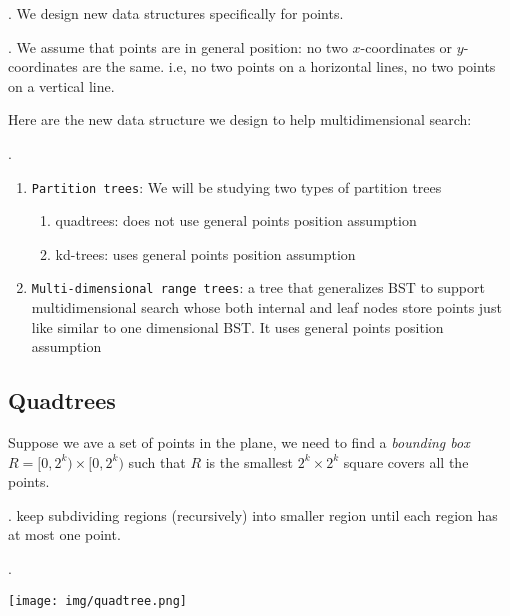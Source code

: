 \documentclass{article}
\begin{document}
\begin{discovery}[].
    We design new data structures specifically for points. 
\end{discovery}

\begin{comm}[].
    We assume that points are in general position: no two $x$-coordinates or $y$-coordinates are the same. i.e, no two points on a horizontal lines, no two points on a vertical line. 
\end{comm}

Here are the new data structure we design to help multidimensional search: 

\begin{result}[].
    \begin{enumerate}
        \item \texttt{Partition trees}: We will be studying two types of partition trees \begin{enumerate}
            \item quadtrees: does not use general points position assumption \item kd-trees: uses general points position assumption 
        \end{enumerate}
        
        \item \texttt{Multi-dimensional range trees}: a tree that generalizes BST to support multidimensional search whose both internal and leaf nodes store points just like similar to one dimensional BST. It uses general points position assumption
    \end{enumerate} 
\end{result}


\subsection{Quadtrees} 

Suppose we ave a set of points in the plane, we need to find a \textit{bounding box} $R = [0, 2^k) \times [0, 2^k)$ such that $R$ is the smallest $2^k \times 2^k$ square covers all the points. 

\begin{codes}[].
    keep subdividing regions (recursively) into smaller region until each region has at most one point. 
\end{codes}

\begin{examplee}[].
    \begin{center}
        \texttt{[image: img/quadtree.png]}
    \end{center}
\end{examplee}
\end{document}
